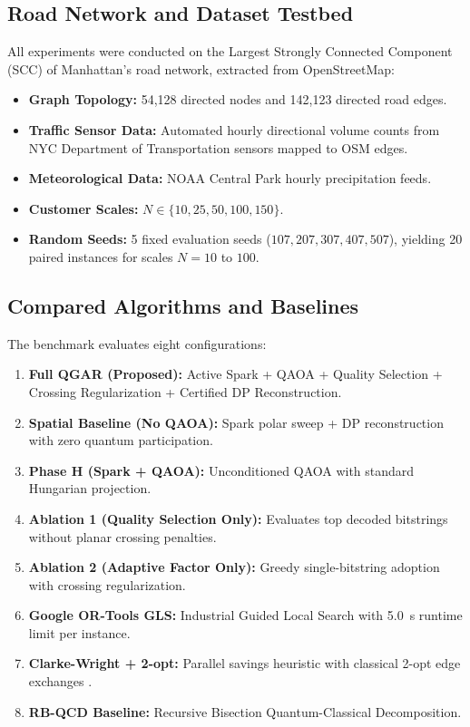 \documentclass[journal,10pt]{IEEEtran}
\begin{document}
\subsection{Road Network and Dataset Testbed}
All experiments were conducted on the Largest Strongly Connected Component (SCC) of Manhattan's road network, extracted from OpenStreetMap:
\begin{itemize}
    \item \textbf{Graph Topology:} 54,128 directed nodes and 142,123 directed road edges.
    \item \textbf{Traffic Sensor Data:} Automated hourly directional volume counts from NYC Department of Transportation sensors mapped to OSM edges.
    \item \textbf{Meteorological Data:} NOAA Central Park hourly precipitation feeds.
    \item \textbf{Customer Scales:} $N \in \{10, 25, 50, 100, 150\}$.
    \item \textbf{Random Seeds:} 5 fixed evaluation seeds ($107, 207, 307, 407, 507$), yielding 20 paired instances for scales $N=10$ to $100$.
\end{itemize}

\subsection{Compared Algorithms and Baselines}
The benchmark evaluates eight configurations:
\begin{enumerate}
    \item \textbf{Full QGAR (Proposed):} Active Spark + QAOA + Quality Selection + Crossing Regularization + Certified DP Reconstruction.
    \item \textbf{Spatial Baseline (No QAOA):} Spark polar sweep + DP reconstruction with zero quantum participation.
    \item \textbf{Phase H (Spark + QAOA):} Unconditioned QAOA with standard Hungarian projection.
    \item \textbf{Ablation 1 (Quality Selection Only):} Evaluates top decoded bitstrings without planar crossing penalties.
    \item \textbf{Ablation 2 (Adaptive Factor Only):} Greedy single-bitstring adoption with crossing regularization.
    \item \textbf{Google OR-Tools GLS:} Industrial Guided Local Search \cite{voudouris1999guided} with 5.0~s runtime limit per instance.
    \item \textbf{Clarke-Wright + 2-opt:} Parallel savings heuristic \cite{clarke1964scheduling} with classical 2-opt edge exchanges \cite{croes1958method}.
    \item \textbf{RB-QCD Baseline:} Recursive Bisection Quantum-Classical Decomposition.
\end{enumerate}
\end{document}
